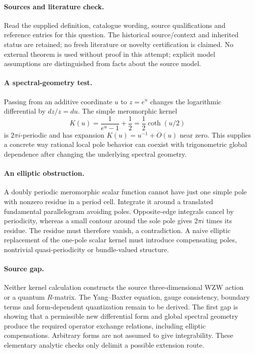 \documentclass[11pt]{article}
\begin{document}
\paragraph{Sources and literature check.}
Read the supplied definition, catalogue wording, source qualifications and reference entries for this question. The historical source/context and inherited status are retained; no fresh literature or novelty certification is claimed. No external theorem is used without proof in this attempt; explicit model assumptions are distinguished from facts about the source model.

\paragraph{A spectral-geometry test.} Passing from an additive coordinate \(u\) to \(z=e^u\) changes the logarithmic differential by \(dz/z=du\). The simple meromorphic kernel
\[
 K(u)=\frac1{e^u-1}+\frac12=\frac12\coth(u/2)
\]
is \(2\pi i\)-periodic and has expansion \(K(u)=u^{-1}+O(u)\) near zero. This supplies a concrete way rational local pole behavior can coexist with trigonometric global dependence after changing the underlying spectral geometry.
\paragraph{An elliptic obstruction.} A doubly periodic meromorphic scalar function cannot have just one simple pole with nonzero residue in a period cell. Integrate it around a translated fundamental parallelogram avoiding poles. Opposite-edge integrals cancel by periodicity, whereas a small contour around the sole pole gives \(2\pi i\) times its residue. The residue must therefore vanish, a contradiction. A naive elliptic replacement of the one-pole scalar kernel must introduce compensating poles, nontrivial quasi-periodicity or bundle-valued structure.
\paragraph{Source gap.} Neither kernel calculation constructs the source three-dimensional WZW action or a quantum \(R\)-matrix. The Yang--Baxter equation, gauge consistency, boundary terms and form-dependent quantization remain to be derived. The first gap is showing that a permissible new differential form and global spectral geometry produce the required operator exchange relations, including elliptic compensations. Arbitrary forms are not assumed to give integrability. These elementary analytic checks only delimit a possible extension route.
\end{document}
